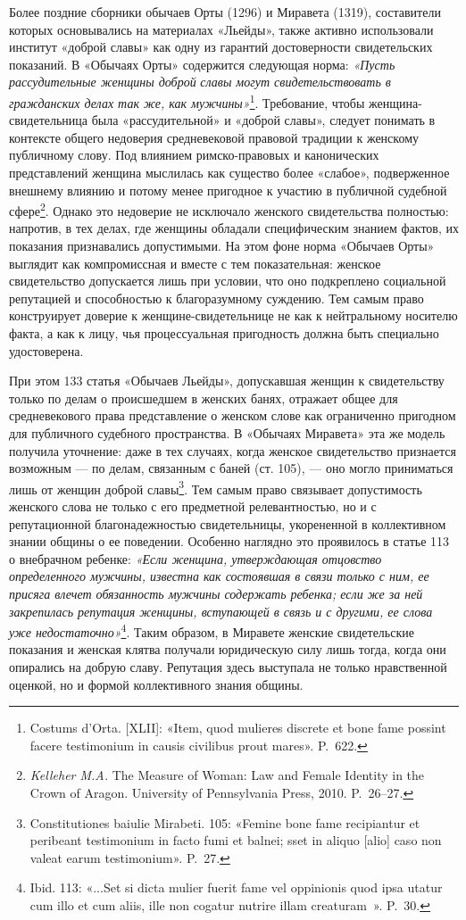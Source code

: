 Более поздние сборники обычаев Орты (1296) и Миравета (1319), составители которых основывались на материалах «Льейды», также активно использовали институт «доброй славы» как одну из гарантий достоверности свидетельских показаний. В «Обычаях Орты» содержится следующая норма: \emph{«Пусть рассудительные женщины доброй }\emph{славы могут свидетельствовать в гражданских делах так же, как мужчины»}\footnote{Costums d’Orta. [XLII]: «Item, quod mulieres discrete et bone fame possint facere testimonium in causis civilibus prout mares». P.~622.}.\emph{ }Требование, чтобы женщина-свидетельница была «рассудительной» и «доброй славы», следует понимать в контексте общего недоверия средневековой правовой традиции к женскому публичному слову. Под влиянием римско-правовых и канонических представлений женщина мыслилась как существо более «слабое», подверженное внешнему влиянию и потому менее пригодное к участию в публичной судебной сфере\footnote{\emph{Kelleher M.A.} The Measure of Woman: Law and Female Identity in the Crown of Aragon. University of Pennsylvania Press, 2010. P.~26--27.}. Однако это недоверие не исключало женского свидетельства полностью: напротив, в тех делах, где женщины обладали специфическим знанием фактов, их показания признавались допустимыми. На этом фоне норма «Обычаев Орты» выглядит как компромиссная и вместе с тем показательная: женское свидетельство допускается лишь при условии, что оно подкреплено социальной репутацией и способностью к благоразумному суждению. Тем самым право конструирует доверие к женщине-свидетельнице не как к нейтральному носителю факта, а как к лицу, чья процессуальная пригодность должна быть специально удостоверена.

При этом 133 статья «Обычаев Льейды», допускавшая женщин к свидетельству только по делам о происшедшем в женских банях, отражает общее для средневекового права представление о женском слове как ограниченно пригодном для публичного судебного пространства. В «Обычаях Миравета» эта же модель получила уточнение: даже в тех случаях, когда женское свидетельство признается возможным --- по делам, связанным с баней (ст. 105), --- оно могло приниматься лишь от женщин доброй славы\footnote{Constitutiones baiulie Mirabeti. 105: «Femine bone fame recipiantur et peribeant testimonium in facto fumi et balnei; sset in aliquo [alio] caso non valeat earum testimonium». P.~27.}. Тем самым право связывает допустимость женского слова не только с его предметной релевантностью, но и с репутационной благонадежностью свидетельницы, укорененной в коллективном знании общины о ее поведении. Особенно наглядно это проявилось в статье 113 о внебрачном ребенке: \emph{«Если женщина, утверждающая отцовство определенного мужчины, известна как состоявшая в связи только с ним, ее присяга влечет обязанность мужчины содержать ребенка; если же за ней закрепилась репутация женщины, вступающей в связь и с другими, ее слова уже недостаточно»}\footnote{Ibid. 113: «...Set si dicta mulier fuerit fame vel oppinionis quod ipsa utatur cum illo et cum aliis, ille non cogatur nutrire illam creaturam~». P.~30.}. Таким образом, в Миравете женские свидетельские показания и женская клятва получали юридическую силу лишь тогда, когда они опирались на добрую славу. Репутация здесь выступала не только нравственной оценкой, но и формой коллективного знания общины.

